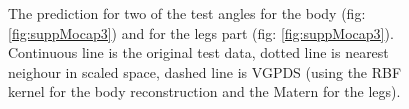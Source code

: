 \documentclass{article} %
\begin{document}
\begin{figure}[ht]
\begin{center}
\end{center}
\caption{\small{
The prediction for two of the test angles for the body (fig: \ref{fig:suppMocap3}) and for the legs part (fig: \ref{fig:suppMocap3}). Continuous line is the original test data, dotted line is nearest neighour in scaled space, dashed line is VGPDS (using the RBF kernel for the body reconstruction and the Matern for the legs).
}
}
\label{fig:supplMocap2}
\end{figure}
\end{document}
